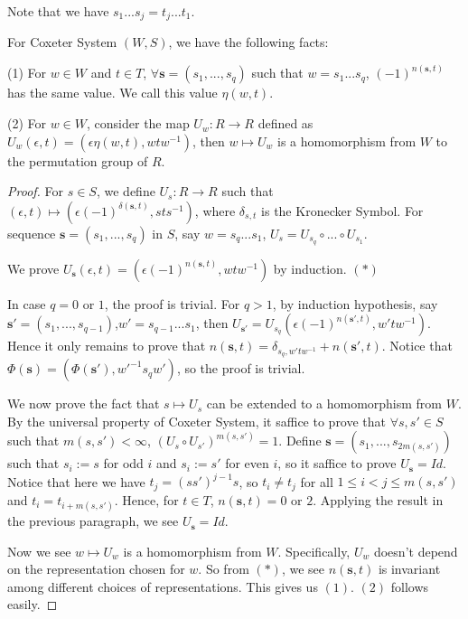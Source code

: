\begin{remark*}
    Note that we have $s_1...s_j=t_j...t_1$.
\end{remark*} 

\begin{lemma}\label{lem:sign}
    For Coxeter System $(W,S)$, we have the following facts:

\indent (1) For $w \in W$ and $t \in T$, $\forall \mathbf{s}=(s_1,...,s_q)$ such that $w=s_1...s_q$, $(-1)^{n(\mathbf{s},t)}$ has the same value. We call this value $\eta(w,t)$.

\indent (2) For $w \in W$, consider the map $U_w:R \rightarrow R$ defined as $U_w(\epsilon,t)=(\epsilon \eta (w,t),wtw^{-1})$, then $w \mapsto U_w$ is a homomorphism from $W$ to the permutation group of $R$. 
\end{lemma}  

\begin{proof}
    For $s \in S$, we define $U_s:R \rightarrow R$ such that $(\epsilon,t) \mapsto (\epsilon(-1)^{\delta(\mathbf{s},t)},sts^{-1})$, where $\delta_{s,t}$ is the Kronecker Symbol. For sequence $\mathbf{s}=(s_1,...,s_q)$ in $S$, say $w=s_q...s_1$, $U_s=U_{s_q}\circ...\circ U_{s_1}$.

 We prove $U_{\mathbf{s}}(\epsilon,t)=(\epsilon(-1)^{n(\mathbf{s},t)},wtw^{-1})$ by induction. $(*)$

 In case $q=0$ or $1$, the proof is trivial. For $q >1$, by induction hypothesis, say $\mathbf{s'}=(s_1,...,s_{q-1})$,$w'=s_{q-1}...s_1$, then $U_{\mathbf{s'}}=U_{s_q}(\epsilon(-1)^{n(\mathbf{s'},t)},w'tw^{-1})$. Hence it only remains to prove that $n(\mathbf{s},t)=\delta_{s_q,w'tw^{-1}}+n(\mathbf{s'},t)$. Notice that $\Phi(\mathbf{s})=(\Phi(\mathbf{s'}),w'^{-1}s_qw')$, so the proof is trivial.

 We now prove the fact that $s\mapsto U_s$ can be extended to a homomorphism from $W$. By the universal property of Coxeter System, it saffice to prove that $\forall s,s' \in S$ such that $m(s,s') < \infty$, $(U_s \circ U_{s'})^{m(s,s')}=1$. Define $\mathbf{s}=(s_1,...,s_{2m(s,s')})$ such that $s_i:=s$ for odd $i$ and $s_i:=s'$ for even $i$, so it saffice to prove $U_{\mathbf{s}}=Id$. Notice that here we have $t_j=(ss')^{j-1}s$, so $t_i \ne t_j$ for all $1\le i<j \le m(s,s')$ and $t_i=t_{i+m(s,s')}$. Hence, for $t \in T$, $n(\mathbf{s},t)=0$ or $2$. Applying the result in the previous paragraph, we see $U_{\mathbf{s}}=Id$. 

 Now we see $w\mapsto U_w$ is a homomorphism from $W$. Specifically, $U_w$ doesn't depend on the representation chosen for $w$. So from $(*)$, we see $n(\mathbf{s},t)$ is invariant among different choices of representations. This gives us $(1)$. $(2)$ follows easily.
\end{proof}

